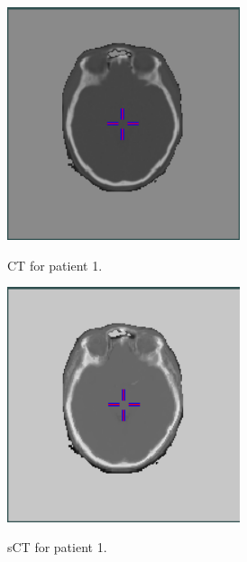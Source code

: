 \begin{figure}
    \centering
    \begin{subfigure}[b]{0.3\textwidth}
        \caption{CT for patient 1.}
        \includegraphics[width=0.75\textwidth]{colager/loocv_ct/loocv_010476_ct.png}
        \label{col:loocv_ct_pat1_ct}
    \end{subfigure}\hfill
    \begin{subfigure}[b]{0.3\textwidth}
        \caption{sCT for patient 1.}
        \includegraphics[width=0.75\textwidth]{colager/loocv_ct/loocv_010476_sct.png}
        \label{col:loocv_ct_pat1_sct}
    \end{subfigure}\hfill
    \begin{subfigure}[b]{0.3\textwidth}

\end{subfigure}
\end{figure}
